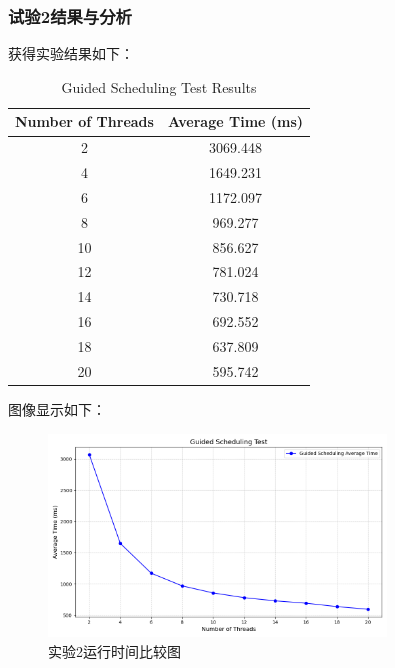 \documentclass{nku}
\begin{document}
\subsubsection{试验2结果与分析}
获得实验结果如下：
\begin{table}[H]
\centering
\caption{Guided Scheduling Test Results}
\begin{tabular}{cc}
\toprule
\textbf{Number of Threads} & \textbf{Average Time (ms)} \\
\midrule
2  & 3069.448 \\
4  & 1649.231 \\
6  & 1172.097 \\
8  & 969.277 \\
10 & 856.627 \\
12 & 781.024 \\
14 & 730.718 \\
16 & 692.552 \\
18 & 637.809 \\
20 & 595.742 \\
\bottomrule
\end{tabular}
\label{table:guided-scheduling-new}
\end{table}


图像显示如下：
\begin{figure}[H]
\centering
\includegraphics[width=0.8\textwidth]{fig/fig4.png}
\caption{实验2运行时间比较图}
\end{figure}
\end{document}
